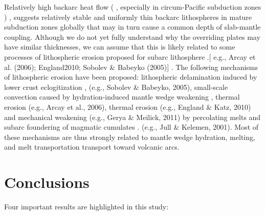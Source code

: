 \documentclass[draft,linenumbers]{agujournal2018} %
\providecommand{\DIFaddtex}[1]{{\protect\color{blue} \sf #1}} %
\providecommand{\DIFdeltex}[1]{{\protect\color{red} \scriptsize #1}} %
\providecommand{\DIFaddbegin}{} %
\providecommand{\DIFaddend}{} %
\providecommand{\DIFdelbegin}{} %
\providecommand{\DIFdelend}{} %
\providecommand{\DIFadd}[1]{\texorpdfstring{\DIFaddtex{#1}}{#1}} %
\providecommand{\DIFdel}[1]{\texorpdfstring{\DIFdeltex{#1}}{}} %
\newcommand{\DIFscaledelfig}{0.3}
\newlength{\DIFdelgraphicswidth} %
\newlength{\DIFdelgraphicsheight} %
\newcommand{\DIFaddincludegraphics}[2][]{{\color{blue}\fbox{\DIFOincludegraphics[#1]{#2}}}} %
\newcommand{\DIFdelincludegraphics}[2][]{%
\sbox{\DIFdelgraphicsbox}{\DIFOincludegraphics[#1]{#2}}%
\settoboxwidth{\DIFdelgraphicswidth}{\DIFdelgraphicsbox} %
\settoboxtotalheight{\DIFdelgraphicsheight}{\DIFdelgraphicsbox} %
\scalebox{\DIFscaledelfig}{%
\parbox[b]{\DIFdelgraphicswidth}{\usebox{\DIFdelgraphicsbox}\\[-\baselineskip] \rule{\DIFdelgraphicswidth}{0em}}\llap{\resizebox{\DIFdelgraphicswidth}{\DIFdelgraphicsheight}{%
\setlength{\unitlength}{\DIFdelgraphicswidth}%
\begin{picture}(1,1)%
\thicklines\linethickness{2pt} %
{\color[rgb]{1,0,0}\put(0,0){\framebox(1,1){}}}%
{\color[rgb]{1,0,0}\put(0,0){\line( 1,1){1}}}%
{\color[rgb]{1,0,0}\put(0,1){\line(1,-1){1}}}%
\end{picture}%
}\hspace*{3pt}}} %
} %
\DeclareRobustCommand{\DIFaddbegin}{\DIFOaddbegin \let\includegraphics\DIFaddincludegraphics} %
\DeclareRobustCommand{\DIFaddend}{\DIFOaddend \let\includegraphics\DIFOincludegraphics} %
\DeclareRobustCommand{\DIFdelbegin}{\DIFOdelbegin \let\includegraphics\DIFdelincludegraphics} %
\DeclareRobustCommand{\DIFdelend}{\DIFOaddend \let\includegraphics\DIFOincludegraphics} %
\begin{document}
Relatively high backarc heat flow\DIFdelbegin \DIFdel{(}\DIFdelend \DIFaddbegin \DIFadd{, }\DIFaddend especially in circum-Pacific
subduction zones\DIFdelbegin \DIFdel{) }\DIFdelend \DIFaddbegin \DIFadd{, }\DIFaddend suggests relatively stable and uniformly thin backarc
lithospheres in mature subduction zones globally that may in turn cause
a common depth of slab-mantle coupling. Although we do not yet fully
understand why the overriding plates may have similar thicknesses, we
can assume that this is likely related to some processes of lithospheric
erosion proposed for subarc lithosphere \DIFdelbegin %
\DIFdel{.}\DIFdelend \DIFaddbegin {[}\DIFadd{e.g., Arcay et al. (2006);
England2010; Sobolev \& Babeyko (2005)}{]}\DIFadd{. }\DIFaddend The following mechanisms of
lithospheric erosion have been proposed: lithospheric delamination
induced by lower crust eclogitization \DIFdelbegin %
\DIFdel{, }\DIFdelend \DIFaddbegin \DIFadd{(e.g., Sobolev \& Babeyko, 2005),
}\DIFaddend small-scale convection caused by hydration-induced mantle wedge
weakening \DIFdelbegin %
\DIFdel{, thermal erosion }%
\DIFdelend \DIFaddbegin \DIFadd{(e.g., Arcay et al., 2006), thermal erosion (e.g., England \&
Katz, 2010) }\DIFaddend and mechanical weakening \DIFdelbegin %
\DIFdelend \DIFaddbegin \DIFadd{(e.g., Gerya \& Meilick, 2011) }\DIFaddend by
percolating melts and subarc foundering of magmatic cumulates \DIFdelbegin %
\DIFdel{.}\DIFdelend \DIFaddbegin \DIFadd{(e.g.,
Jull \& Kelemen, 2001). }\DIFaddend Most of these mechanisms are thus strongly
related to mantle wedge hydration, melting, and melt \DIFdelbegin \DIFdel{transportation }\DIFdelend \DIFaddbegin \DIFadd{transport }\DIFaddend toward
volcanic arcs.

\section{Conclusions}
\DIFaddbegin

\DIFaddend Four important results are highlighted in this study:
\end{document}
